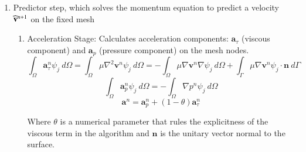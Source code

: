 \begin{enumerate}
  \item Predictor step, which solves the momentum equation to predict a velocity $\widehat{\mathbf{v}}^{n+1}$ on the fixed mesh
  \begin{enumerate}
    \item Acceleration Stage: Calculates acceleration components: $\mathbf{a}_{\tau}$ (viscous component) and $\mathbf{a}_{p}$ (pressure component) on the mesh nodes.
      \begin{equation}\label{Step1a}
      \int_{\Omega}\mathbf{a}^{n}_{\tau}\psi_j\ d\Omega=\int_{\Omega}\mu \nabla^{2}\mathbf{v}^{n} \psi_j\ d\Omega=-\int_{\Omega}\mu \nabla\mathbf{v}^{n} \nabla \psi_j\ d\Omega + \int_{\Gamma}\mu \nabla\mathbf{v}^{n} \psi_j \cdot \mathbf{n} \ d\Gamma
      \end{equation}
      \begin{equation}\label{Step1b}
      \int_{\Omega}\mathbf{a}^{n}_{p}\psi_j\ d\Omega=-\int_{\Omega}\nabla p^{n} \psi_j\ d\Omega
      \end{equation}
      \begin{equation}\label{Step1c}
      \mathbf{a}^{n}=\mathbf{a}^{n}_{p} + (1-\theta)\mathbf{a}^{n}_{\tau}
      \end{equation}

      Where $\theta$ is a numerical parameter that rules the explicitness of the viscous term in the algorithm and $\mathbf{n}$ is the unitary vector normal to the surface.


\end{enumerate}
\end{enumerate}
